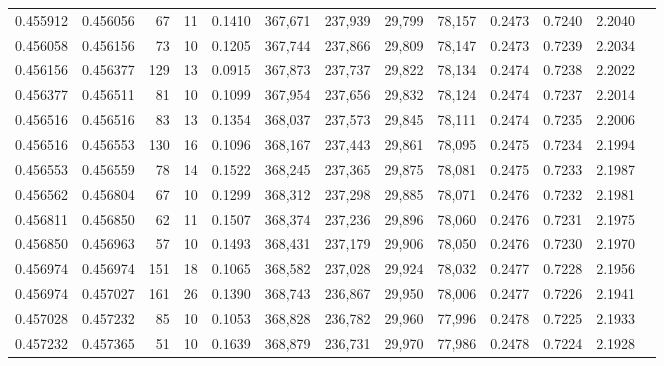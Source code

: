 \begin{tabular}{rrrrrrrrrrrrr}
0.455912 & 0.456056 &    67 &  11 &                                     0.1410 & 367,671 & 237,939 &  29,799 &  78,157 & 0.2473 & 0.7240 & 2.2040 \\
0.456058 & 0.456156 &    73 &  10 &                                     0.1205 & 367,744 & 237,866 &  29,809 &  78,147 & 0.2473 & 0.7239 & 2.2034 \\
0.456156 & 0.456377 &   129 &  13 &                                     0.0915 & 367,873 & 237,737 &  29,822 &  78,134 & 0.2474 & 0.7238 & 2.2022 \\
0.456377 & 0.456511 &    81 &  10 &                                     0.1099 & 367,954 & 237,656 &  29,832 &  78,124 & 0.2474 & 0.7237 & 2.2014 \\
0.456516 & 0.456516 &    83 &  13 &                                     0.1354 & 368,037 & 237,573 &  29,845 &  78,111 & 0.2474 & 0.7235 & 2.2006 \\
0.456516 & 0.456553 &   130 &  16 &                                     0.1096 & 368,167 & 237,443 &  29,861 &  78,095 & 0.2475 & 0.7234 & 2.1994 \\
0.456553 & 0.456559 &    78 &  14 &                                     0.1522 & 368,245 & 237,365 &  29,875 &  78,081 & 0.2475 & 0.7233 & 2.1987 \\
0.456562 & 0.456804 &    67 &  10 &                                     0.1299 & 368,312 & 237,298 &  29,885 &  78,071 & 0.2476 & 0.7232 & 2.1981 \\
0.456811 & 0.456850 &    62 &  11 &                                     0.1507 & 368,374 & 237,236 &  29,896 &  78,060 & 0.2476 & 0.7231 & 2.1975 \\
0.456850 & 0.456963 &    57 &  10 &                                     0.1493 & 368,431 & 237,179 &  29,906 &  78,050 & 0.2476 & 0.7230 & 2.1970 \\
0.456974 & 0.456974 &   151 &  18 &                                     0.1065 & 368,582 & 237,028 &  29,924 &  78,032 & 0.2477 & 0.7228 & 2.1956 \\
0.456974 & 0.457027 &   161 &  26 &                                     0.1390 & 368,743 & 236,867 &  29,950 &  78,006 & 0.2477 & 0.7226 & 2.1941 \\
0.457028 & 0.457232 &    85 &  10 &                                     0.1053 & 368,828 & 236,782 &  29,960 &  77,996 & 0.2478 & 0.7225 & 2.1933 \\
0.457232 & 0.457365 &    51 &  10 &                                     0.1639 & 368,879 & 236,731 &  29,970 &  77,986 & 0.2478 & 0.7224 & 2.1928 \\

\end{tabular}
